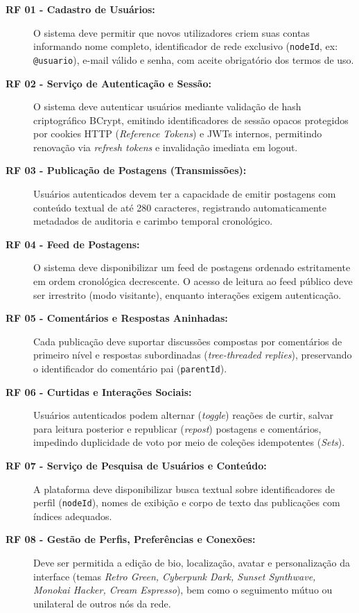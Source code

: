 \documentclass[12pt,a4paper]{report}
\begin{document}
\begin{description}
    \item[\textbf{RF 01 - Cadastro de Usuários:}] O sistema deve permitir que novos utilizadores criem suas contas informando nome completo, identificador de rede exclusivo (\texttt{nodeId}, ex: \texttt{@usuario}), e-mail válido e senha, com aceite obrigatório dos termos de uso.
    
    \item[\textbf{RF 02 - Serviço de Autenticação e Sessão:}] O sistema deve autenticar usuários mediante validação de hash criptográfico BCrypt, emitindo identificadores de sessão opacos protegidos por cookies HTTP (\textit{Reference Tokens}) e JWTs internos, permitindo renovação via \textit{refresh tokens} e invalidação imediata em logout.
    
    \item[\textbf{RF 03 - Publicação de Postagens (Transmissões):}] Usuários autenticados devem ter a capacidade de emitir postagens com conteúdo textual de até 280 caracteres, registrando automaticamente metadados de auditoria e carimbo temporal cronológico.
    
    \item[\textbf{RF 04 - Feed de Postagens:}] O sistema deve disponibilizar um feed de postagens ordenado estritamente em ordem cronológica decrescente. O acesso de leitura ao feed público deve ser irrestrito (modo visitante), enquanto interações exigem autenticação.
    
    \item[\textbf{RF 05 - Comentários e Respostas Aninhadas:}] Cada publicação deve suportar discussões compostas por comentários de primeiro nível e respostas subordinadas (\textit{tree-threaded replies}), preservando o identificador do comentário pai (\texttt{parentId}).
    
    \item[\textbf{RF 06 - Curtidas e Interações Sociais:}] Usuários autenticados podem alternar (\textit{toggle}) reações de curtir, salvar para leitura posterior e republicar (\textit{repost}) postagens e comentários, impedindo duplicidade de voto por meio de coleções idempotentes (\textit{Sets}).
    
    \item[\textbf{RF 07 - Serviço de Pesquisa de Usuários e Conteúdo:}] A plataforma deve disponibilizar busca textual sobre identificadores de perfil (\texttt{nodeId}), nomes de exibição e corpo de texto das publicações com índices adequados.
    
    \item[\textbf{RF 08 - Gestão de Perfis, Preferências e Conexões:}] Deve ser permitida a edição de bio, localização, avatar e personalização da interface (temas \textit{Retro Green, Cyberpunk Dark, Sunset Synthwave, Monokai Hacker, Cream Espresso}), bem como o seguimento mútuo ou unilateral de outros nós da rede.
\end{description}
\end{document}
